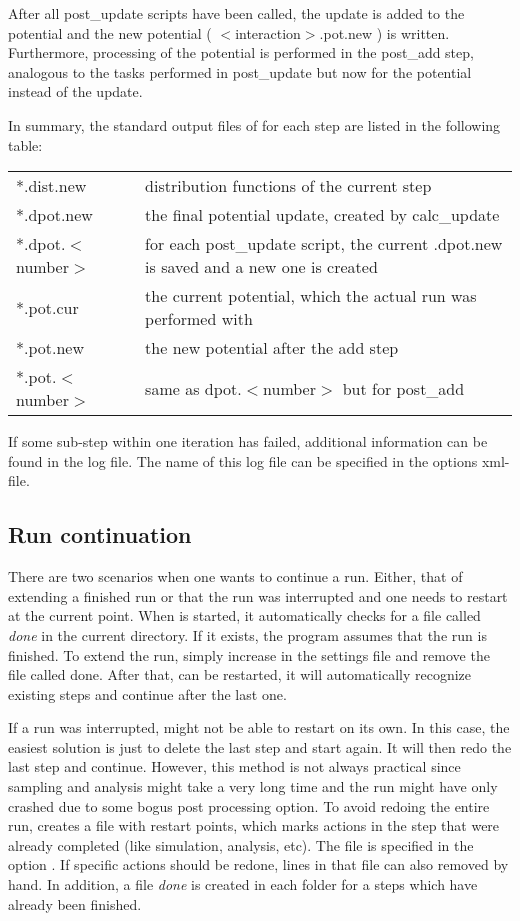 After all post\_update scripts have been called, the update is added to the potential and the new potential ( $<$interaction$>$.pot.new ) is written. Furthermore, processing of the potential is performed in the post\_add step, analogous to the tasks performed in post\_update but now for the potential instead of the update.

In summary, the standard output files of \votca for each step are listed in the following table:

\begin{tabular}{ll}
*.dist.new & distribution functions of the current step \\
*.dpot.new & the final potential update, created by calc\_update \\
*.dpot.$<$number$>$ & for each post\_update script, the current .dpot.new is saved and a new one is created\\
*.pot.cur & the current potential, which the actual run was performed with \\
*.pot.new & the new potential after the add step \\
*.pot.$<$number$>$ & same as dpot.$<$number$>$ but for post\_add
\end{tabular}

If some sub-step within one iteration has failed, additional information can be found in the log file. The name of this log file can be specified in the options xml-file.

\subsection{Run continuation}
There are two scenarios when one wants to continue a run. Either, that of extending a finished run or that the run was interrupted and one needs to restart at the current point. When  is started, it automatically checks for a file called \textit{done} in the current directory. If it exists, the program assumes that the run is finished. To extend the run, simply increase  in the settings file and remove the file called done. After that,  can be restarted, it will automatically recognize existing steps and continue after the last one.

If a run was interrupted,  might not be able to restart on its own. In this case, the easiest solution is just to delete the last step and start again. It will then redo the last step and continue. However, this method is not always practical since sampling and analysis might take a very long time and the run might have only crashed due to some bogus post processing option. To avoid redoing the entire run,  creates a file with restart points, which marks actions in the step that were already completed (like simulation, analysis, etc). The file is specified in the option . If specific actions should be redone, lines in that file can also removed by hand. In addition, a file \textit{done} is created in each folder for a steps which have already been finished.

